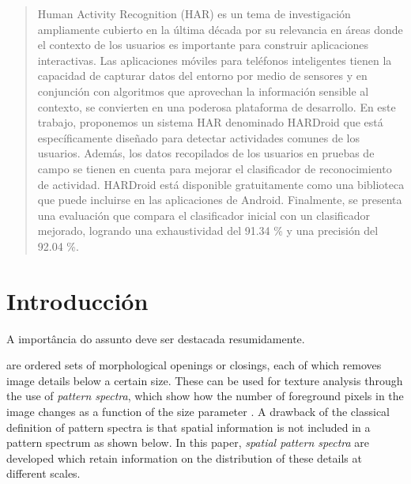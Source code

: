\documentclass{sciposter}
\begin{document}
\begin{multicols}{3}

\begin{abstract}
Human Activity Recognition (HAR) es un tema de investigación ampliamente cubierto en la última década por su relevancia en áreas donde el contexto de los usuarios es importante para construir aplicaciones interactivas. Las aplicaciones móviles para teléfonos inteligentes tienen la capacidad de capturar datos del entorno por medio de sensores y en conjunción con algoritmos que aprovechan la información sensible al contexto, se convierten en una poderosa plataforma de desarrollo. En este trabajo, proponemos un sistema HAR denominado HARDroid que está específicamente diseñado para detectar actividades comunes de los usuarios. Además, los datos recopilados de los usuarios en pruebas de campo se tienen en cuenta para mejorar el clasificador de reconocimiento de actividad. HARDroid está disponible gratuitamente como una biblioteca que puede incluirse en las aplicaciones de Android. Finalmente, se presenta una evaluación que compara el clasificador inicial con un clasificador mejorado, logrando una exhaustividad del 91.34 \% y una precisión del 92.04 \%.
\end{abstract}

\section{Introducción}
A importância do assunto deve ser destacada resumidamente.

 are ordered sets of morphological openings or closings, each of
which removes image details below a certain size. These can be used for texture
analysis
through the use of \emph{pattern spectra}, which show how the number of 
foreground pixels in the image changes as a function of the size parameter 
\cite{maragos89:_patter}.
A drawback of the classical definition of pattern spectra is that spatial 
information is not included in a pattern spectrum as shown below.
 In this paper, \emph{spatial pattern spectra} are developed which retain information on the distribution of these details at different scales.
 

\newcommand{\imsize}{0.45\columnwidth}
\begin{figure}
\begin{center}
\begin{tabular}{c c}


\end{tabular}
\end{center}
\end{figure}
\end{multicols}
\end{document}
